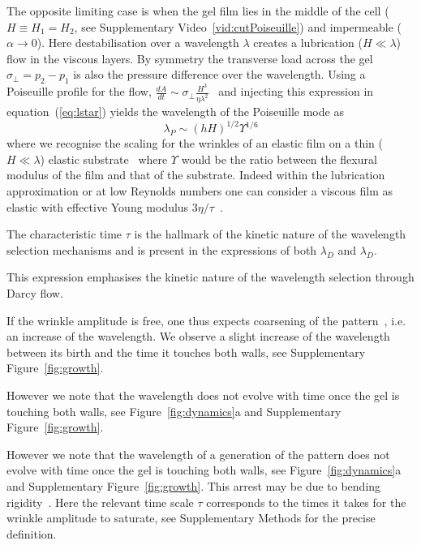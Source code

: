 \documentclass[twocolumn,superscriptaddress,showpacs,preprintnumbers,
amsmath,amssymb,prl]{revtex4-1}
\begin{document}
The opposite limiting case is when the gel film lies in the middle of the cell ($H\equiv H_1=H_2$, see Supplementary Video~\ref{vid:cutPoiseuille}) and impermeable ($\alpha\rightarrow 0$). Here destabilisation over a wavelength $\lambda$ creates a lubrication ($H\ll\lambda$) flow in the viscous layers. By symmetry the transverse load across the gel $\sigma_{\perp}=p_2-p_1$ is also the pressure difference over the wavelength. Using a Poiseuille profile for the flow, $\frac{dA}{dt} \sim \sigma_{\perp} \frac{H^3}{\eta\lambda^2}$~\cite{Poiseuille1842} and injecting this expression in equation~(\ref{eq:lstar}) yields the wavelength of the Poiseuille mode as
\begin{equation}
\lambda_P \sim (hH)^{1/2} \Upsilon^{1/6}
\end{equation}
where we recognise the scaling for the wrinkles of an elastic film on a thin ($H\ll\lambda$) elastic substrate~\cite{Cerda2003} where $\Upsilon$ would be the ratio between the flexural modulus of the film and that of the substrate. Indeed within the lubrication approximation or at low Reynolds numbers one can consider a viscous film as elastic with effective Young modulus $3\eta/\tau$~\cite{Biot1957,Boudaoud2001}.


The characteristic time $\tau$ is the hallmark of the kinetic nature of the wavelength selection mechanisms and is present in the expressions of both $\lambda_D$ and $\lambda_D$. 

This expression emphasises the kinetic nature of the wavelength selection through Darcy flow. 



If the wrinkle amplitude is free, one thus expects coarsening of the pattern~\cite{Yoo2003}, i.e. an increase of the wavelength. We observe a slight increase of the wavelength between its birth and the time it touches both walls, see Supplementary Figure~\ref{fig:growth}.


However we note that the wavelength does not evolve with time once the gel is touching both walls, see Figure~\ref{fig:dynamics}a and Supplementary Figure~\ref{fig:growth}.


However we note that the wavelength of a generation of the pattern does not evolve with time once the gel is touching both walls, see Figure~\ref{fig:dynamics}a and Supplementary Figure~\ref{fig:growth}. This arrest may be due to bending rigidity~\cite{LeGoff2014}. Here the relevant time scale $\tau$ corresponds to the times it takes for the wrinkle amplitude to saturate, see Supplementary Methods for the precise definition.
\end{document}
